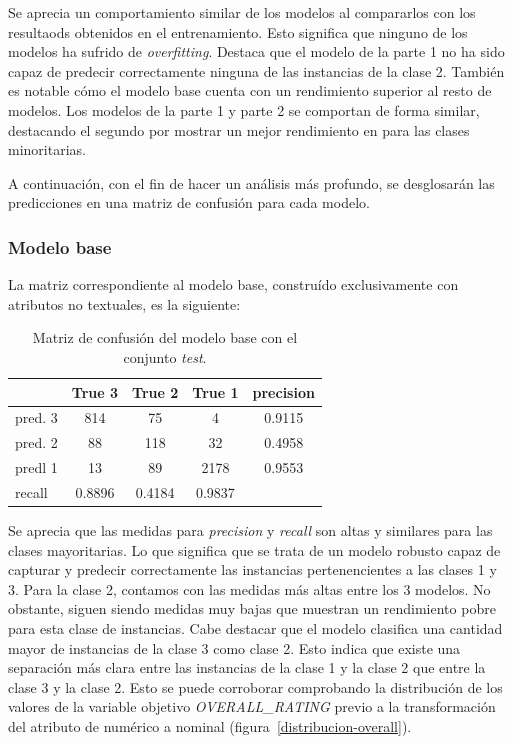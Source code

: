 \documentclass[es]{uc3mreport}
\begin{document}
\begin{report}
Se aprecia un comportamiento similar de los modelos al compararlos con los
resultaods obtenidos en el entrenamiento. Esto significa que ninguno de los
modelos ha sufrido de \textit{overfitting}. Destaca que el modelo de la parte 1
no ha sido capaz de predecir correctamente ninguna de las instancias de la clase
2. También es notable cómo el modelo base cuenta con un rendimiento superior al
resto de modelos. Los modelos de la parte 1 y parte 2 se comportan de forma
similar, destacando el segundo por mostrar un mejor rendimiento en para las
clases minoritarias.

A continuación, con el fin de hacer un análisis más profundo, se desglosarán las
predicciones en una matriz de confusión para cada modelo.

\subsubsection{Modelo base}
\label{eva-modelobase}
La matriz correspondiente al modelo base, construído exclusivamente con
atributos no textuales, es la siguiente:

\begin{table}
\begin{tabular}{@{}lccc|c@{}}
    \toprule
             & True 3 & True 2 & True 1 & precision\\
    \midrule
    pred. 3  & 814   & 75      & 4      & 0.9115   \\
    pred. 2  & 88    & 118     & 32     & 0.4958   \\
    predl 1  & 13    & 89      & 2178   & 0.9553   \\
    \midrule
    recall   & 0.8896 & 0.4184 & 0.9837 &          \\
    \bottomrule
\end{tabular}
\caption{Matriz de confusión del modelo base con el conjunto \textit{test}.}
\end{table}

Se aprecia que las medidas para \textit{precision} y \textit{recall} son altas y
similares para las clases mayoritarias. Lo que significa que se trata de un modelo robusto capaz de capturar
y predecir correctamente las instancias pertenencientes a las clases 1 y 3. Para
la clase 2, contamos con las medidas más altas entre los 3 modelos. No obstante,
siguen siendo medidas muy bajas que muestran un rendimiento pobre para esta
clase de instancias. Cabe destacar que el modelo clasifica una cantidad mayor de
instancias de la clase 3 como clase 2. Esto indica que existe una separación más
clara entre las instancias de la clase 1 y la clase 2 que entre la clase 3 y la
clase 2. Esto se puede corroborar comprobando la distribución de los valores de la variable
objetivo \textit{OVERALL\_RATING} previo a la transformación del atributo de
numérico a nominal (figura~\ref{distribucion-overall}).


\end{report}
\end{document}
